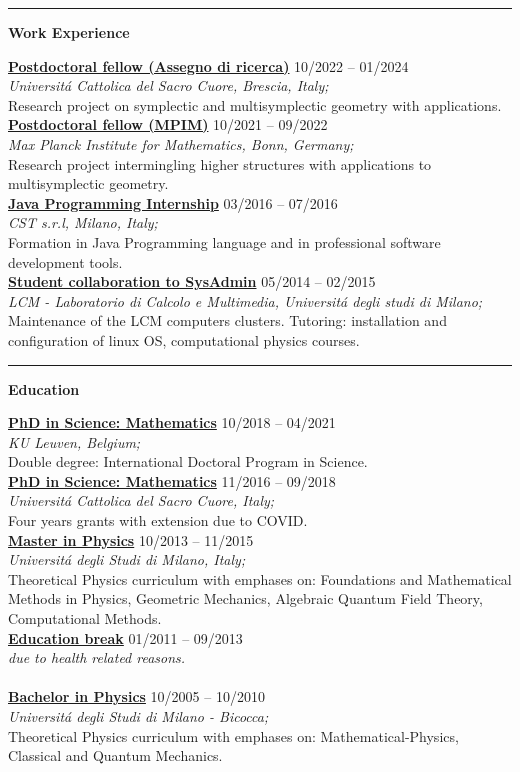 \documentclass[a4paper]{article}
\newcommand{\block}[1]{\hrule \vspace{0.2cm} \textbf{\Large #1} \vspace{0.2cm}}
\newcommand{\voice}[5]{\href{#4}{\textbf{#1}} \hfill #2 \\ \textit{#3} \\ {\small #5} \vspace{0.2cm} \\}
\begin{document}

	\block{Work Experience}

	\voice{Postdoctoral fellow (Assegno di ricerca)}
		{10/2022 -- 01/2024}
		{Universit\'a Cattolica del Sacro Cuore, Brescia, Italy;}
		{https://dipartimenti.unicatt.it/dmf-home}       
		{Research project on symplectic and multisymplectic geometry with applications.}
	\voice{Postdoctoral fellow (MPIM)}
		{10/2021 -- 09/2022}
		{Max Planck Institute for Mathematics, Bonn, Germany;}
		{https://www.mpim-bonn.mpg.de/}       
		{Research project intermingling higher structures with applications to multisymplectic geometry.}
	\voice{Java Programming Internship}
		{03/2016 -- 07/2016}
		{CST s.r.l, Milano, Italy;}
		{https://www.csttech.it/}       
		{Formation in Java Programming language and in professional software development tools.}
	\voice{Student collaboration to SysAdmin}
		{05/2014 -- 02/2015}
		{LCM - Laboratorio di Calcolo e Multimedia, Universit\'a degli studi di Milano;}
		{https://lcm.mi.infn.it/}       
		{Maintenance of the LCM computers clusters. Tutoring: installation and configuration of linux OS, computational physics courses.\vspace{-0.25cm}}


	\block{Education}

	\voice{PhD in Science: Mathematics}
		{10/2018 -- 04/2021}
		{KU Leuven, Belgium;}
		{https://web.archive.org/save/http://scuoledidottorato.unicatt.it/phdschools/science-research-projects}       
		{Double degree: International Doctoral Program in Science.}
	\voice{PhD in Science: Mathematics}
		{11/2016 -- 09/2018}
		{Universit\'a Cattolica del Sacro Cuore, Italy;}
		{https://web.archive.org/save/http://scuoledidottorato.unicatt.it/phdschools/science-research-projects}       
		{Four years grants with extension due to COVID.}
	\voice{Master in Physics}
		{10/2013 -- 11/2015}
		{Universit\'a degli Studi di Milano, Italy;}
		{https://fisica-lm.cdl.unimi.it/it}       
		{Theoretical Physics curriculum with emphases on: Foundations and Mathematical Methods in Physics, Geometric Mechanics, Algebraic Quantum Field Theory, Computational Methods.}
	\voice{Education break}
		{01/2011 -- 09/2013}
		{due to health related reasons.}
		{}       
		{\vspace{-0.25cm}}
	\voice{Bachelor in Physics}
		{10/2005 -- 10/2010}
		{Universit\'a degli Studi di Milano - Bicocca;}
		{https://www.fisica.unimib.it/en}        
		{Theoretical Physics curriculum with emphases on: Mathematical-Physics, Classical and Quantum Mechanics.}
\end{document}

